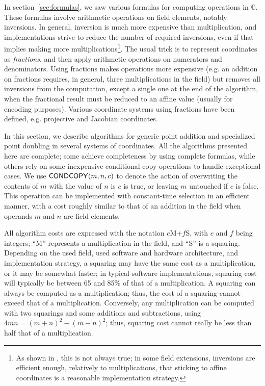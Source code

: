 \documentclass{llncs}
\newcommand{\bG}{\mathbb{G}}
\begin{document}
In section~\ref{sec:formulas}, we saw various formulas for computing
operations in $\bG$. These formulas involve arithmetic operations on
field elements, notably inversions. In general, inversion is much more
expensive than multiplication, and implementations strive to reduce the
number of required inversions, even if that implies making more
multiplications\footnote{As shown in \cite{Por2020-1}, this is not
always true; in some field extensions, inversions are efficient
enough, relatively to multiplications, that sticking to affine
coordinates is a reasonable implementation strategy.}. The usual trick
is to represent coordinates as \emph{fractions}, and then apply
arithmetic operations on numerators and denominators. Using fractions
makes operations more expensive (e.g. an addition on fractions requires,
in general, three multiplications in the field) but removes all
inversions from the computation, except a single one at the end of the
algorithm, when the fractional result must be reduced to an affine value
(usually for encoding purposes). Various coordinate systems using
fractions have been defined, e.g. projective and Jacobian coordinates.

In this section, we describe algorithms for generic point addition and
specialized point doubling in several systems of coordinates. All the
algorithms presented here are complete; some achieve completeness by
using complete formulas, while others rely on some inexpensive
conditional copy operations to handle exceptional cases. We use
$\text{\textsf{CONDCOPY}}(m,n,c)$ to denote the action of overwriting
the contents of $m$ with the value of $n$ is $c$ is true, or leaving $m$
untouched if $c$ is false. This operation can be implemented with
constant-time selection in an efficient manner, with a cost roughly
similar to that of an addition in the field when operands $m$ and $n$
are field elements.

All algorithm costs are expressed with the notation $e$M+$f$S, with
$e$ and $f$ being integers; ``M'' represents a multiplication in the
field, and ``S'' is a squaring. Depending on the used field, used
software and hardware architecture, and implementation strategy, a
squaring may have the same cost as a multiplication, or it may be
somewhat faster; in typical software implementations, squaring cost will
typically be between 65 and 85\% of that of a multiplication. A squaring
can always be computed as a multiplication; thus, the cost of a squaring
cannot exceed that of a multiplication. Conversely, any multiplication
can be computed with two squarings and some additions and subtractions,
using $4mn = (m+n)^2 - (m-n)^2$; thus, squaring cost cannot really be
less than half that of a multiplication.
\end{document}
